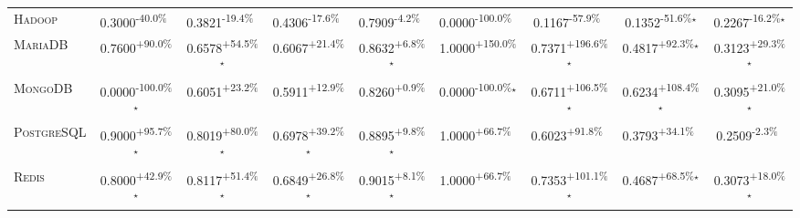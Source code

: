 \begin{table}[htbp]
\begin{tabular}{l|cccc|cccc}
\textsc{Hadoop} & \cellcolor{red!30}0.3000\textsuperscript{-40.0\%}$^{\,\,\,}$ & \cellcolor{red!30}0.3821\textsuperscript{-19.4\%}$^{\,\,\,}$ & \cellcolor{red!30}0.4306\textsuperscript{-17.6\%}$^{\,\,\,}$ & \cellcolor{red!30}0.7909\textsuperscript{-4.2\%}$^{\,\,\,}$ & \cellcolor{red!30}0.0000\textsuperscript{-100.0\%}$^{\,\,\,}$ & \cellcolor{red!30}0.1167\textsuperscript{-57.9\%}$^{\,\,\,}$ & \cellcolor{red!30}0.1352\textsuperscript{-51.6\%}$^\star$ & \cellcolor{red!30}0.2267\textsuperscript{-16.2\%}$^\star$ \\
\textsc{MariaDB} & \cellcolor{green!30}0.7600\textsuperscript{+90.0\%}$^{\,\,\,}$ & \cellcolor{green!30}0.6578\textsuperscript{+54.5\%}$^\star$ & \cellcolor{green!30}0.6067\textsuperscript{+21.4\%}$^{\,\,\,}$ & \cellcolor{green!30}0.8632\textsuperscript{+6.8\%}$^\star$ & \cellcolor{green!30}1.0000\textsuperscript{+150.0\%}$^{\,\,\,}$ & \cellcolor{green!30}0.7371\textsuperscript{+196.6\%}$^\star$ & \cellcolor{green!30}0.4817\textsuperscript{+92.3\%}$^\star$ & \cellcolor{green!30}0.3123\textsuperscript{+29.3\%}$^\star$ \\
\textsc{MongoDB} & \cellcolor{red!30}0.0000\textsuperscript{-100.0\%}$^\star$ & \cellcolor{green!30}0.6051\textsuperscript{+23.2\%}$^{\,\,\,}$ & \cellcolor{green!30}0.5911\textsuperscript{+12.9\%}$^{\,\,\,}$ & \cellcolor{green!30}0.8260\textsuperscript{+0.9\%}$^{\,\,\,}$ & \cellcolor{red!30}0.0000\textsuperscript{-100.0\%}$^\star$ & \cellcolor{green!30}0.6711\textsuperscript{+106.5\%}$^\star$ & \cellcolor{green!30}0.6234\textsuperscript{+108.4\%}$^\star$ & \cellcolor{green!30}0.3095\textsuperscript{+21.0\%}$^\star$ \\
\textsc{PostgreSQL} & \cellcolor{green!30}0.9000\textsuperscript{+95.7\%}$^\star$ & \cellcolor{green!30}0.8019\textsuperscript{+80.0\%}$^\star$ & \cellcolor{green!30}0.6978\textsuperscript{+39.2\%}$^\star$ & \cellcolor{green!30}0.8895\textsuperscript{+9.8\%}$^\star$ & \cellcolor{green!30}1.0000\textsuperscript{+66.7\%}$^{\,\,\,}$ & \cellcolor{green!30}0.6023\textsuperscript{+91.8\%}$^{\,\,\,}$ & \cellcolor{green!30}0.3793\textsuperscript{+34.1\%}$^{\,\,\,}$ & \cellcolor{red!30}0.2509\textsuperscript{-2.3\%}$^{\,\,\,}$ \\
\textsc{Redis} & \cellcolor{green!30}0.8000\textsuperscript{+42.9\%}$^\star$ & \cellcolor{green!30}0.8117\textsuperscript{+51.4\%}$^\star$ & \cellcolor{green!30}0.6849\textsuperscript{+26.8\%}$^\star$ & \cellcolor{green!30}0.9015\textsuperscript{+8.1\%}$^\star$ & \cellcolor{green!30}1.0000\textsuperscript{+66.7\%}$^{\,\,\,}$ & \cellcolor{green!30}0.7353\textsuperscript{+101.1\%}$^\star$ & \cellcolor{green!30}0.4687\textsuperscript{+68.5\%}$^\star$ & \cellcolor{green!30}0.3073\textsuperscript{+18.0\%}$^\star$ \\

\end{tabular}
\end{table}
